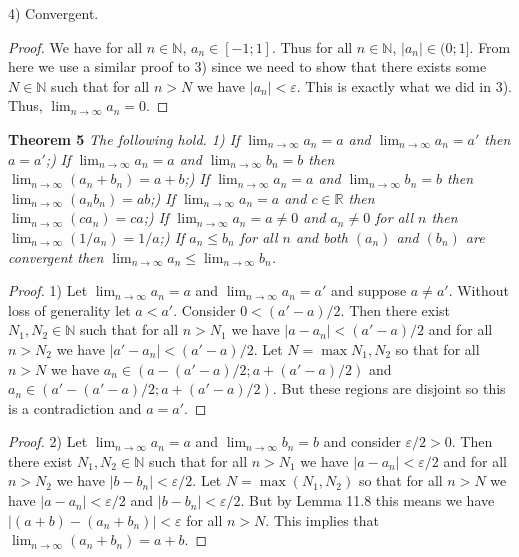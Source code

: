 \documentclass{article}
\begin{document}
\begin{flushleft}
4) Convergent.
\begin{proof}
We have for all $n \in \mathbb{N}$, $a_n \in [-1;1]$. Thus for all $n \in \mathbb{N}$, $|a_n| \in (0;1]$. From here we use a similar proof to 3) since we need to show that there exists some $N \in \mathbb{N}$ such that for all $n > N$ we have $|a_n| < \varepsilon$. This is exactly what we did in 3). Thus, $\lim_{n \rightarrow \infty} a_n = 0$.
\end{proof}

\textbf{Theorem 5}
\textsl{The following hold.
1) If $\lim_{n \rightarrow \infty} a_n = a$ and $\lim_{n \rightarrow \infty} a_n = a'$ then $a=a'$;) If $\lim_{n \rightarrow \infty} a_n = a$ and $\lim_{n \rightarrow \infty} b_n = b$ then $\lim_{n \rightarrow \infty} (a_n + b_n) = a+b$;) If $\lim_{n \rightarrow \infty} a_n = a$ and $\lim_{n \rightarrow \infty} b_n = b$ then $\lim_{n \rightarrow \infty} (a_n b_n) = ab$;) If $\lim_{n \rightarrow \infty} a_n = a$ and $c \in \mathbb{R}$ then $\lim_{n \rightarrow \infty} (ca_n) = ca$;) If $\lim_{n \rightarrow \infty} a_n = a \neq 0$ and $a_n \neq 0$ for all $n$ then $\lim_{n \rightarrow \infty} (1 / a_n) = 1/a$;) If $a_n \leq b_n$ for all $n$ and both $(a_n)$ and $(b_n)$ are convergent then $\lim_{n \rightarrow \infty} a_n \leq \lim_{n \rightarrow \infty} b_n$.}
\begin{proof}
1) Let $\lim_{n \rightarrow \infty} a_n = a$ and $\lim_{n \rightarrow \infty} a_n = a'$ and suppose $a \neq a'$. Without loss of generality let $a<a'$. Consider $0 < (a'-a)/2$. Then there exist $N_1, N_2 \in \mathbb{N}$ such that for all $n>N_1$ we have $|a-a_n| < (a'-a)/2$ and for all $n>N_2$ we have $|a'-a_n| < (a'-a)/2$. Let $N = \max{N_1,N_2}$ so that for all $n>N$ we have $a_n \in (a-(a'-a)/2 ; a + (a'-a)/2)$ and $a_n \in (a'-(a'-a)/2 ; a + (a'-a)/2)$. But these regions are disjoint so this is a contradiction and $a = a'$.
\end{proof}
\begin{proof}
2) Let $\lim_{n \rightarrow \infty} a_n = a$ and $\lim_{n \rightarrow \infty} b_n = b$ and consider $\varepsilon/2 > 0$. Then there exist $N_1, N_2 \in \mathbb{N}$ such that for all $n > N_1$ we have $|a-a_n| < \varepsilon/2$ and for all $n > N_2$ we have $|b-b_n| < \varepsilon/2$. Let $N = \max (N_1,N_2)$ so that for all $n>N$ we have $|a-a_n| < \varepsilon/2$ and $|b-b_n| < \varepsilon/2$. But by Lemma 11.8 this means we have $|(a+b) - (a_n+b_n)| < \varepsilon$ for all $n>N$. This implies that $\lim_{n \rightarrow \infty} (a_n+b_n) = a+b$.

\end{proof}
\end{flushleft}
\end{document}
